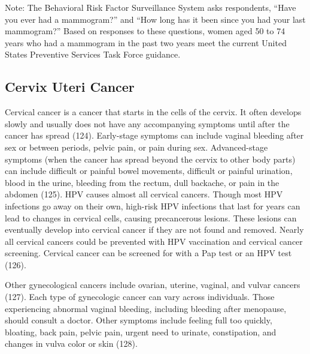 \documentclass[
  english,
  letterpaper,
]{report}
\begin{document}
\begin{tcolorbox}[enhanced jigsaw, breakable, leftrule=.75mm, title=\textcolor{quarto-callout-note-color}{\faInfo}\hspace{0.5em}{Note}, bottomrule=.15mm, opacityback=0, left=2mm, colback=white, bottomtitle=1mm, coltitle=black, colbacktitle=quarto-callout-note-color!10!white, colframe=quarto-callout-note-color-frame, opacitybacktitle=0.6, toptitle=1mm, titlerule=0mm, arc=.35mm, rightrule=.15mm, toprule=.15mm]

Note: The Behavioral Risk Factor Surveillance System asks respondents,
``Have you ever had a mammogram?'' and ``How long has it been since you
had your last mammogram?'' Based on responses to these questions, women
aged 50 to 74 years who had a mammogram in the past two years meet the
current United States Preventive Services Task Force guidance.

\end{tcolorbox}

\subsection{Cervix Uteri Cancer}\label{cervix-uteri-cancer}

Cervical cancer is a cancer that starts in the cells of the cervix. It
often develops slowly and usually does not have any accompanying
symptoms until after the cancer has spread (124). Early-stage symptoms
can include vaginal bleeding after sex or between periods, pelvic pain,
or pain during sex. Advanced-stage symptoms (when the cancer has spread
beyond the cervix to other body parts) can include difficult or painful
bowel movements, difficult or painful urination, blood in the urine,
bleeding from the rectum, dull backache, or pain in the abdomen (125).
HPV causes almost all cervical cancers. Though most HPV infections go
away on their own, high-risk HPV infections that last for years can lead
to changes in cervical cells, causing precancerous lesions. These
lesions can eventually develop into cervical cancer if they are not
found and removed. Nearly all cervical cancers could be prevented with
HPV vaccination and cervical cancer screening. Cervical cancer can be
screened for with a Pap test or an HPV test (126).

Other gynecological cancers include ovarian, uterine, vaginal, and
vulvar cancers (127). Each type of gynecologic cancer can vary across
individuals. Those experiencing abnormal vaginal bleeding, including
bleeding after menopause, should consult a doctor. Other symptoms
include feeling full too quickly, bloating, back pain, pelvic pain,
urgent need to urinate, constipation, and changes in vulva color or skin
(128).
\end{document}

